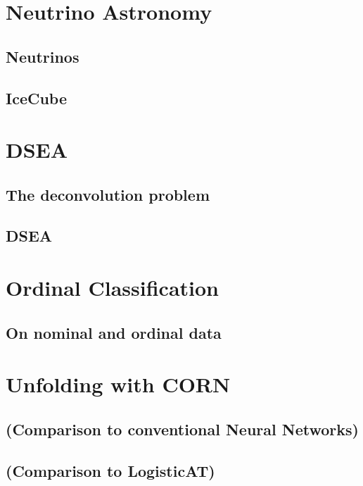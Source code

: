 
\chapter{Neutrino Astronomy}
  \section{Neutrinos}
  \blindtext[8]
  \section{IceCube}
  \blindtext[5]
\chapter{DSEA}
  \section{The deconvolution problem} %
  \blindtext[3]
  \section{DSEA} %
  \blindtext[10]
\chapter{Ordinal Classification}
  \section{On nominal and ordinal data}
  \blindtext[3]
  
\chapter{Unfolding with CORN}
  
  
  
  \section{(Comparison to conventional Neural Networks)}
  \section{(Comparison to LogisticAT)}

